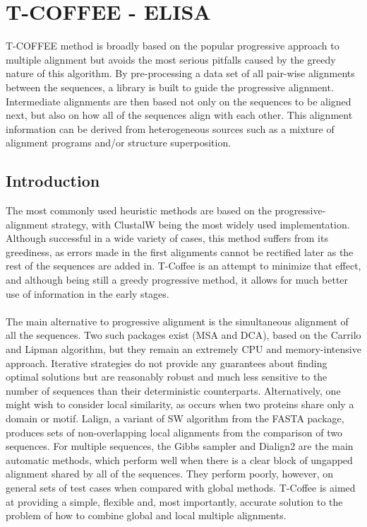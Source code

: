 \graphicspath{{chapters/09/images}}
\chapter{T-COFFEE - ELISA}
T-COFFEE method is broadly based on the popular progressive approach to multiple alignment but avoids the most serious pitfalls caused by the greedy nature of this algorithm.
By pre-processing a data set of all pair-wise alignments between the sequences, a library is built to guide the progressive alignment.
Intermediate alignments are then based not only on the sequences to be aligned next, but also on how all of the sequences align with each other. This alignment information can be derived from heterogeneous sources such as a mixture of alignment programs and/or structure superposition.

\section{Introduction}
The most commonly used heuristic methods are based on the progressive-alignment strategy, with ClustalW being the most widely used implementation.
Although successful in a wide variety of cases, this method suffers from its greediness, as errors made in the first alignments cannot be rectified later as the rest of the sequences are added in.
T-Coffee is an attempt to minimize that effect, and although being still a greedy progressive method, it allows for much better use of information in the early stages.
\\
\\
\noindent
The main alternative to progressive alignment is the simultaneous alignment of all the sequences. Two such packages exist (MSA and DCA), based on the Carrilo and Lipman algorithm, but they remain an extremely CPU and memory-intensive approach.
Iterative strategies do not provide any guarantees about finding optimal solutions but are reasonably robust and much less sensitive to the number of sequences than their deterministic counterparts.
Alternatively, one might wish to consider local similarity, as occurs when two proteins share only a domain or motif.
Lalign, a variant of SW algorithm from the FASTA package, produces sets of non-overlapping local alignments from the comparison of two sequences.
For multiple sequences, the Gibbs sampler and Dialign2 are the main automatic methods, which perform well when there is a clear block of ungapped alignment shared by all of the sequences.
They perform poorly, however, on general sets of test cases when compared with global methods.
T-Coffee is aimed at providing a simple,  flexible and, most importantly, accurate solution to the problem of how to combine global and local multiple alignments.

